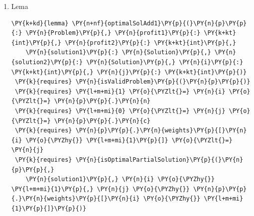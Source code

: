 \begin{sloppypar}
\begin{enumerate}
\begin{Verbatim}[commandchars=\\\{\}]
\end{Verbatim}
     trebuie să demonstrăm că dacă din acestă soluție vom extrage ultimul obiect adăugat atunci vom obține o soluție optimă pentru o subproblemă cu un obiect mai puțin și capacitatea rămasă a rucsacului după eliminarea greutății corespunzătoare obiectului:
     \begin{Verbatim}[commandchars=\\\{\}]
\PY{k}{ensures} \PY{n}{isOptimalPartialSolution}\PY{p}{(}\PY{n}{p}\PY{p}{,} \PY{n}{solution}\PY{p}{[}\PY{p}{..}\PY{n}{i} \PY{o}{\PYZhy{}} \PY{l+m+mi}{1}\PY{p}{]}\PY{p}{,} 
        \PY{n}{i} \PY{o}{\PYZhy{}} \PY{l+m+mi}{1}\PY{p}{,} \PY{n}{j} \PY{o}{\PYZhy{}} \PY{n}{p}\PY{p}{.}\PY{n}{weights}\PY{p}{[}\PY{n}{i} \PY{o}{\PYZhy{}} \PY{l+m+mi}{1}\PY{p}{]}\PY{p}{)}
\end{Verbatim}
    \hspace{2mm} Pentru a putea demonstra această lemă, am început prin a presupune că soluția rămasă după eliminarea obiectului nu este optimă pentru subproblema ($i - 1, j - p.weights[i - 1]$), dar că există o presupusă soluție $x$ ce aduce un profit optim pentru aceasta   . Dar dacă pentru această soluție am adăuga obiectul $i$, am obține o soluție de lungime $i$ cu un profit mai bun decât $solution$, ceea ce contrazice precondiția lemei, deci este presupunerea făcută la început este falsă.
     \item Lema 
     \begin{Verbatim}[commandchars=\\\{\}]
\PY{k+kd}{lemma} \PY{n+nf}{optimalSolAdd1}\PY{p}{(}\PY{n}{p}\PY{p}{:} \PY{n}{Problem}\PY{p}{,} \PY{n}{profit1}\PY{p}{:} \PY{k+kt}{int}\PY{p}{,} \PY{n}{profit2}\PY{p}{:} \PY{k+kt}{int}\PY{p}{,} 
    \PY{n}{solution1}\PY{p}{:} \PY{n}{Solution}\PY{p}{,} \PY{n}{solution2}\PY{p}{:} \PY{n}{Solution}\PY{p}{,} \PY{n}{i}\PY{p}{:} \PY{k+kt}{int}\PY{p}{,} \PY{n}{j}\PY{p}{:} \PY{k+kt}{int}\PY{p}{)}
 \PY{k}{requires} \PY{n}{isValidProblem}\PY{p}{(}\PY{n}{p}\PY{p}{)}
 \PY{k}{requires} \PY{l+m+mi}{1} \PY{o}{\PYZlt{}=} \PY{n}{i} \PY{o}{\PYZlt{}=} \PY{n}{p}\PY{p}{.}\PY{n}{n}
 \PY{k}{requires} \PY{l+m+mi}{0} \PY{o}{\PYZlt{}=} \PY{n}{j} \PY{o}{\PYZlt{}=} \PY{n}{p}\PY{p}{.}\PY{n}{c}
 \PY{k}{requires} \PY{n}{p}\PY{p}{.}\PY{n}{weights}\PY{p}{[}\PY{n}{i} \PY{o}{\PYZhy{}} \PY{l+m+mi}{1}\PY{p}{]} \PY{o}{\PYZlt{}=} \PY{n}{j}
 \PY{k}{requires} \PY{n}{isOptimalPartialSolution}\PY{p}{(}\PY{n}{p}\PY{p}{,} 
    \PY{n}{solution1}\PY{p}{,} \PY{n}{i} \PY{o}{\PYZhy{}} \PY{l+m+mi}{1}\PY{p}{,} \PY{n}{j} \PY{o}{\PYZhy{}} \PY{n}{p}\PY{p}{.}\PY{n}{weights}\PY{p}{[}\PY{n}{i} \PY{o}{\PYZhy{}} \PY{l+m+mi}{1}\PY{p}{]}\PY{p}{)}

\end{Verbatim}
\end{enumerate}
\end{sloppypar}

